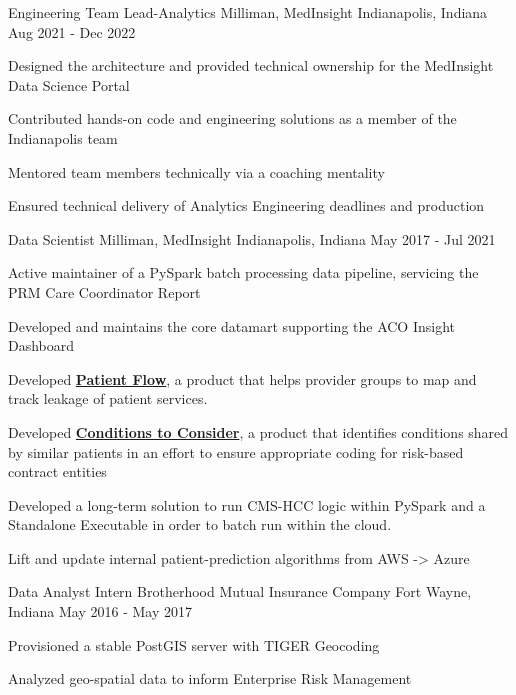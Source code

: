 \begin{cventries}
  \cventry
    {Engineering Team Lead-Analytics} %
    {Milliman, MedInsight} %
    {Indianapolis, Indiana} %
    {Aug 2021 - Dec 2022} %
    {
      \begin{cvitems} %
        \item {Designed the architecture and provided technical ownership for the MedInsight Data Science Portal}
	\item {Contributed hands-on code and engineering solutions as a member of the Indianapolis team}
        \item {Mentored team members technically via a coaching mentality}
	\item {Ensured technical delivery of Analytics Engineering deadlines and production}
      \end{cvitems}
    }

  \cventry
    {Data Scientist} %
    {Milliman, MedInsight} %
    {Indianapolis, Indiana} %
    {May 2017 - Jul 2021} %
    {
      \begin{cvitems} %
        \item {Active maintainer of a PySpark batch processing data pipeline, servicing the PRM Care Coordinator Report}
        \item {Developed and maintains the core datamart supporting the ACO Insight Dashboard}
        \item {Developed \href{http://www.medinsight.milliman.com/uploadedFiles/MedInsight_Site/About/MedInsight-Patient-Flow.pdf}{\textbf{Patient Flow}}, a product that helps provider groups to map and track leakage of patient services.}
	\item {Developed \href{http://assets.milliman.com/ektron/medinsight-machine-learning-conditions-consider.pdf}{\textbf{Conditions to Consider}}, a product that identifies conditions shared by similar patients in an effort to ensure appropriate coding for risk-based contract entities}
	\item {Developed a long-term solution to run CMS-HCC logic within PySpark and a Standalone Executable in order to batch run within the cloud.}
	\item {Lift and update internal patient-prediction algorithms from AWS -> Azure}
      \end{cvitems}
    }

  \cventry
    {Data Analyst Intern} %
    {Brotherhood Mutual Insurance Company} %
    {Fort Wayne, Indiana} %
    {May 2016 - May 2017} %
    {
      \begin{cvitems} %
        \item {Provisioned a stable PostGIS server with TIGER Geocoding}
        \item {Analyzed geo-spatial data to inform Enterprise Risk Management}
      \end{cvitems}
    }


\end{cventries}
